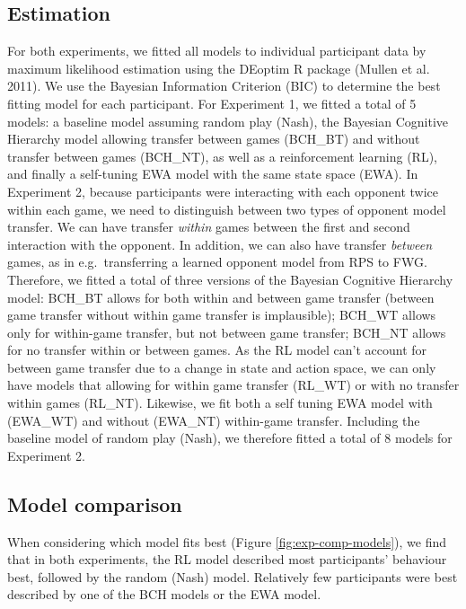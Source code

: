 \documentclass[smallextended]{svjour3}       %
\begin{document}
\hypertarget{estimation}{%
\subsection{Estimation}\label{estimation}}

For both experiments, we fitted all models to individual participant
data by maximum likelihood estimation using the DEoptim R package
(Mullen et al. 2011). We use the Bayesian Information Criterion (BIC) to
determine the best fitting model for each participant. For Experiment 1,
we fitted a total of 5 models: a baseline model assuming random play
(Nash), the Bayesian Cognitive Hierarchy model allowing transfer between
games (BCH\_BT) and without transfer between games (BCH\_NT), as well as
a reinforcement learning (RL), and finally a self-tuning EWA model with
the same state space (EWA). In Experiment 2, because participants were
interacting with each opponent twice within each game, we need to
distinguish between two types of opponent model transfer. We can have
transfer \emph{within} games between the first and second interaction
with the opponent. In addition, we can also have transfer \emph{between}
games, as in e.g.~transferring a learned opponent model from RPS to FWG.
Therefore, we fitted a total of three versions of the Bayesian Cognitive
Hierarchy model: BCH\_BT allows for both within and between game
transfer (between game transfer without within game transfer is
implausible); BCH\_WT allows only for within-game transfer, but not
between game transfer; BCH\_NT allows for no transfer within or between
games. As the RL model can't account for between game transfer due to a
change in state and action space, we can only have models that allowing
for within game transfer (RL\_WT) or with no transfer within games
(RL\_NT). Likewise, we fit both a self tuning EWA model with (EWA\_WT)
and without (EWA\_NT) within-game transfer. Including the baseline model
of random play (Nash), we therefore fitted a total of 8 models for
Experiment 2.

\hypertarget{model-comparison}{%
\subsection{Model comparison}\label{model-comparison}}

When considering which model fits best (Figure
\ref{fig:exp-comp-models}), we find that in both experiments, the RL
model described most participants' behaviour best, followed by the
random (Nash) model. Relatively few participants were best described by
one of the BCH models or the EWA model.
\end{document}
